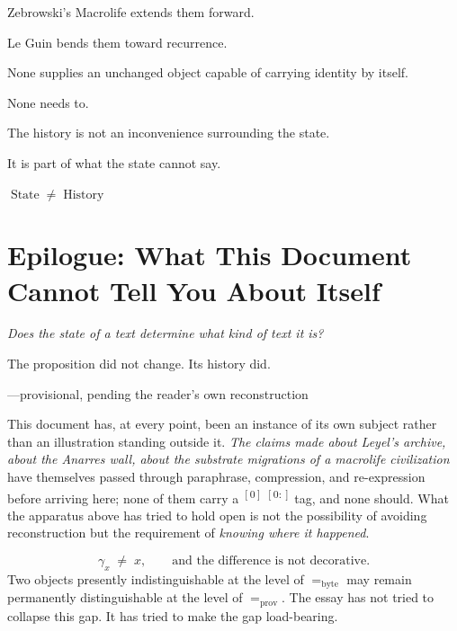 \documentclass[
  11pt,
  a4paper,
  DIV=12,
  BCOR=0mm,
  parskip=half-
]{scrartcl}
\newcommand{\reconstyle}[1]{%
  {\itshape\color{reconink}#1}%
}
\newcommand{\uncertainstyle}[1]{%
  {\sffamily\color{uncertaingray}#1}%
}
\newcommand{\uncertain}[1]{\uncertainstyle{#1}}
\newcommand{\provn}[2][]{%
  \if\relax\detokenize{#1}\relax
    \textsuperscript{$[#2]$}%
  \else
    \textsuperscript{$[#2:#1]$}%
  \fi
}
\newcounter{reconspanledger}
\newcommand{\recon}[1]{%
  \stepcounter{reconspanledger}%
  \reconstyle{#1}%
  \marginnote{%
    \tiny\color{reconink}%
    recon.\ \#\thereconspanledger
  }%
}
\newcommand{\traj}[1]{\gamma_{#1}}
\newcommand{\eqbyte}{=_{\mathrm{byte}}}
\newcommand{\eqprov}{=_{\mathrm{prov}}}
\newcommand{\State}{\operatorname{State}}
\newcommand{\History}{\operatorname{History}}
\theoremstyle{definition}
\theoremstyle{plain}
\theoremstyle{remark}
\newcommand{\movementquestion}[1]{%
  \begin{center}
    \small\itshape
    #1
  \end{center}
  \medskip
}
\begin{document}
Zebrowski's Macrolife extends them forward.

Le Guin bends them toward recurrence.

None supplies an unchanged object capable of carrying identity by itself.

None needs to.

The history is not an inconvenience surrounding the state.

It is part of what the state cannot say.

\bigskip

\begin{center}
  \Large\bfseries
  \(\State \neq \History\)
\end{center}


\section*{Epilogue: What This Document Cannot Tell You About Itself}
\movementquestion{Does the state of a text determine what kind of text it is?}

\epigraph{\uncertain{The proposition did not change. Its history did.}}{---provisional, pending the reader's own reconstruction}

This document has, at every point, been an instance of its own subject rather than an illustration standing outside it. \recon{The claims made about Leyel's archive, about the Anarres wall, about the substrate migrations of a macrolife civilization} have themselves passed through paraphrase, compression, and re-expression before arriving here; none of them carry a \provn{0} tag, and none should. What the apparatus above has tried to hold open is not the possibility of avoiding reconstruction but the requirement of \emph{knowing where it happened}.

\begin{held}
\[
  \traj{x} \;\neq\; x, \qquad\text{and the difference is not decorative.}
\]
Two objects presently indistinguishable at the level of \(\eqbyte\) may remain permanently distinguishable at the level of \(\eqprov\). The essay has not tried to collapse this gap. It has tried to make the gap load-bearing.
\end{held}
\end{document}

